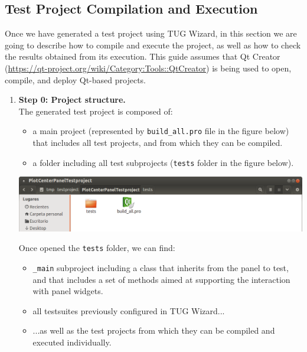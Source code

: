 
\subsection{Test Project Compilation and Execution}

Once we have generated a test project using TUG Wizard, in this
section we are going to describe how to compile and execute the
project, as well as how to check the results obtained from its
execution. This guide assumes that Qt Creator
(\url{https://qt-project.org/wiki/Category:Tools::QtCreator}) is being
used to open, compile, and deploy Qt-based projects.

\begin{enumerate}

%
\item {\bf Step 0: Project structure.}\\
%
  The generated test project is composed of:
\begin{itemize}
\item a main project (represented by {\tt build\_all.pro} file in the
  figure below) that includes all test projects, and from which they
  can be compiled.

\item a folder including all test subprojects ({\tt tests} folder in
  the figure below).
\end{itemize}


\vspace{1ex}
\includegraphics[width=.95\textwidth]{images/tug030a.png}
\vspace{3ex}

\newpage

Once opened the {\tt tests} folder, we can find:
\begin{itemize}

\item {\tt \_main} subproject including a class that inherits from the
  panel to test, and that includes a set of methods aimed at
  supporting the interaction with panel widgets.

\item all testsuites previously configured in TUG Wizard...

\item ...as well as the test projects from which they can be compiled
  and executed individually.
\end{itemize}


\end{enumerate}
